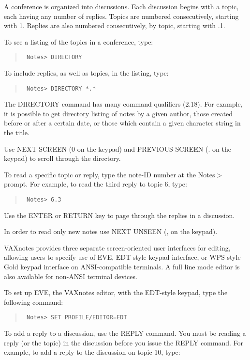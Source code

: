 A conference is organized into discussions.  Each discussion begins with a
topic, each having any number of replies.  Topics are numbered consecutively,
starting with 1.  Replies are also numbered consecutively, by topic, starting
with .1.  

To see a listing of the topics in a conference, type:

\begin{quote}\tt
Notes> DIRECTORY
\end{quote}

To include replies, as well as topics, in the listing, type:

\begin{quote}\tt
Notes> DIRECTORY *.*
\end{quote}

The DIRECTORY command has many command qualifiers (2.18). For example,
it is possible to get directory listing of notes by a given author, 
those created before or after a certain date, or those which contain a given
character string in the title.

Use NEXT SCREEN (0 on the keypad) and PREVIOUS SCREEN (. on the keypad)
to scroll through the directory.

To read a specific topic or reply, type the note-ID number at the Notes$>$
prompt.  For example, to read the third reply to topic 6, type:

\begin{quote}\tt
Notes> 6.3
\end{quote}

Use the ENTER or RETURN key to page through the replies in a discussion.

In order to read only new notes use NEXT UNSEEN (, on the keypad).

VAXnotes provides three separate screen-oriented user interfaces for
editing, allowing users to specify use of EVE, EDT-style keypad
interface, or WPS-style Gold keypad interface on ANSI-compatible terminals.
A full line mode editor is also available for non-ANSI terminal devices.

To set up EVE, the VAXnotes editor, with the EDT-style keypad, type the
following command:

\begin{quote}\tt
Notes> SET PROFILE/EDITOR=EDT
\end{quote}

To add a reply to a discussion, use the REPLY command.  You must be reading
a reply (or the topic) in the discussion before you issue the REPLY command.
For example, to add a reply to the discussion on topic 10, type:

